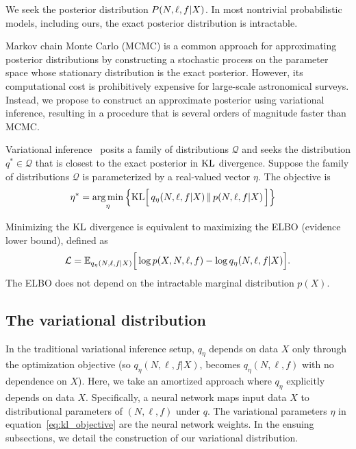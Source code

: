 We seek the posterior distribution 
$P(N, \ell, f | X)$. In most nontrivial probabilistic models, including ours, the exact posterior distribution is intractable.

Markov chain Monte Carlo (MCMC) is a common approach for approximating
posterior distributions by constructing a stochastic process on the parameter space whose stationary distribution is the exact posterior.
However, its computational cost is prohibitively expensive for
large-scale astronomical surveys. Instead, we propose to construct an approximate posterior using variational inference, resulting in a procedure that is several orders of magnitude faster than MCMC.

Variational inference~\cite{Blei_2017_vi_review, Jordan_intro_vi, Wainwrite_graph_models_vi}
posits a family of distributions $\mathcal{Q}$ and seeks
the distribution $q^*\in \mathcal{Q}$ that is closest to the exact posterior
in $\textrm{KL}$ divergence. Suppose the family of distributions $\mathcal{Q}$ is parameterized by a real-valued vector $\eta$. The objective is 
\begin{align}
   \eta^* &= \operatorname*{arg\,min}_{\eta} \Big\{ \mathrm{KL}\Big[\,q_\eta(N, \ell, f | X)\, \| \,p(N, \ell, f | X )\,\Big]\Big\} 
   \label{eq:kl_objective}
\end{align}

Minimizing the $\textrm{KL}$ divergence is equivalent to maximizing the ELBO (evidence lower bound), defined as 
\begin{align}
    \mathcal{L} = 
    \mathbb{E}_{q_\eta(N, \ell, f | X)}\Big[\log p(X, N, \ell, f) - \log q_\eta(N, \ell, f | X)\Big].
    \label{eq:elbo}
\end{align}
The ELBO does not depend on the intractable marginal distribution $p(X)$.

\subsection{The variational distribution}
In the traditional variational inference setup, 
$q_\eta$ depends on data $X$ only through the optimization objective 
(so $q_\eta(N, \ell, f | X)$,
becomes $q_\eta(N, \ell, f)$ with no dependence on $X$). 
Here, we take an amortized approach where
$q_\eta$ explicitly depends on data $X$. Specifically, a neural network 
maps input data $X$ to distributional parameters of $(N, \ell, f)$ 
under $q$. The variational parameters $\eta$ in equation~\eqref{eq:kl_objective} 
are the neural network weights. 
In the ensuing subsections, we detail the construction of our variational distribution. 


